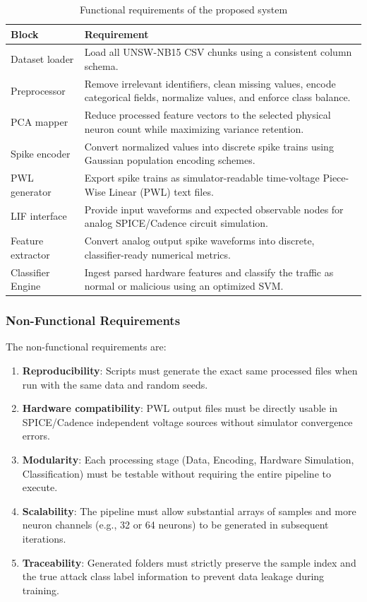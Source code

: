 \documentclass{ieeeaccess}
\begin{document}
\begin{table}[!t]
\centering
\caption{Functional requirements of the proposed system}
\label{tab:functionalrequirements}
\begin{tabular}{|p{}|p{}|}
\hline
\textbf{Block} & \textbf{Requirement} \\
\hline
Dataset loader & Load all UNSW-NB15 CSV chunks using a consistent column schema. \\
\hline
Preprocessor & Remove irrelevant identifiers, clean missing values, encode categorical fields, normalize values, and enforce class balance. \\
\hline
PCA mapper & Reduce processed feature vectors to the selected physical neuron count while maximizing variance retention. \\
\hline
Spike encoder & Convert normalized values into discrete spike trains using Gaussian population encoding schemes. \\
\hline
PWL generator & Export spike trains as simulator-readable time-voltage Piece-Wise Linear (PWL) text files. \\
\hline
LIF interface & Provide input waveforms and expected observable nodes for analog SPICE/Cadence circuit simulation. \\
\hline
Feature extractor & Convert analog output spike waveforms into discrete, classifier-ready numerical metrics. \\
\hline
Classifier Engine & Ingest parsed hardware features and classify the traffic as normal or malicious using an optimized SVM. \\
\hline
\end{tabular}
\end{table}

\subsubsection{Non-Functional Requirements}

The non-functional requirements are:
\begin{enumerate}
\item \textbf{Reproducibility}: Scripts must generate the exact same processed files when run with the same data and random seeds.
\item \textbf{Hardware compatibility}: PWL output files must be directly usable in SPICE/Cadence independent voltage sources without simulator convergence errors.
\item \textbf{Modularity}: Each processing stage (Data, Encoding, Hardware Simulation, Classification) must be testable without requiring the entire pipeline to execute.
\item \textbf{Scalability}: The pipeline must allow substantial arrays of samples and more neuron channels (e.g., 32 or 64 neurons) to be generated in subsequent iterations.
\item \textbf{Traceability}: Generated folders must strictly preserve the sample index and the true attack class label information to prevent data leakage during training.
\end{enumerate}
\end{document}

